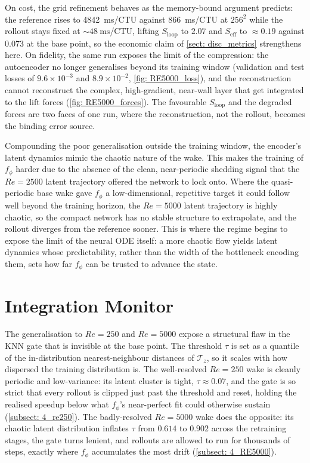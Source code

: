 On cost, the grid refinement behaves as the memory-bound argument predicts: the reference rises to \SI{4842}{\milli\second}/CTU against \SI{866}{\milli\second}/CTU at $256^2$ while the rollout stays fixed at ${\sim}\SI{48}{\milli\second}$/CTU, lifting $S_\text{loop}$ to $2.07$ and $S_\text{eff}$ to $\approx0.19$ against $0.073$ at the base point, so the economic claim of \autoref{sect: disc_metrics} strengthens here. On fidelity, the same run exposes the limit of the compression: the autoencoder no longer generalises beyond its training window (validation and test losses of $9.6\times10^{-3}$ and $8.9\times10^{-2}$, \autoref{fig: RE5000_loss}), and the reconstruction cannot reconstruct the complex, high-gradient, near-wall layer that get integrated to the lift forces (\autoref{fig: RE5000_forces}). The favourable $S_\text{loop}$ and the degraded forces are two faces of one run, where the reconstruction, not the rollout, becomes the binding error source.

Compounding the poor generalisation outside the training window, the encoder's latent dynamics mimic the chaotic nature of the wake. This makes the training of $f_\phi$ harder due to the absence of the clean, near-periodic shedding signal that the $Re=2500$ latent trajectory offered the network to lock onto. Where the quasi-periodic base wake gave $f_\phi$ a low-dimensional, repetitive target it could follow well beyond the training horizon, the $Re=5000$ latent trajectory is highly chaotic, so the compact network has no stable structure to extrapolate, and the rollout diverges from the reference sooner. This is where the regime begins to expose the limit of the neural ODE itself: a more chaotic flow yields latent dynamics whose predictability, rather than the width of the bottleneck encoding them, sets how far $f_\phi$ can be trusted to advance the state.


\section{Integration Monitor}
\label{sect: disc_monitor}

The generalisation to $Re=250$ and $Re=5000$ expose a structural flaw in the KNN gate that is invisible at the base point. The threshold $\tau$ is set as a quantile of the in-distribution nearest-neighbour distances of $\boldsymbol{\mathcal{T}}_z$, so it scales with how dispersed the training distribution is. The well-resolved $Re=250$ wake is cleanly periodic and low-variance: its latent cluster is tight, $\tau\approx0.07$, and the gate is so strict that every rollout is clipped just past the threshold and reset, holding the realised speedup below what $f_\phi$'s near-perfect fit could otherwise sustain (\autoref{subsect: 4_re250}). The badly-resolved $Re=5000$ wake does the opposite: its chaotic latent distribution inflates $\tau$ from $0.614$ to $0.902$ across the retraining stages, the gate turns lenient, and rollouts are allowed to run for thousands of steps, exactly where $f_\phi$ accumulates the most drift (\autoref{subsect: 4_RE5000}).

